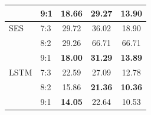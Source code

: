\documentclass[conference]{IEEEtran}
\begin{document}
\begin{table}[ht]
\begin{tabular}{|l|l|c|c|c|}
                               & 9:1                         & 18.66                     & 29.27                          & 13.90                    \\ \hline
        SES                    & 7:3                         & 29.72                     & 36.02                          & 18.90                    \\ \cline{2-5}
                               & 8:2                         & 29.26                     & 66.71                          & 66.71                    \\ \cline{2-5}
                               & 9:1                         & \textbf{18.00}            & \textbf{31.29}                 & \textbf{13.89}           \\ \hline
        LSTM                   & 7:3                         & 22.59                     & 27.09                          & 12.78                    \\ \cline{2-5}
                               & 8:2                         & 15.86                     & \textbf{21.36}                 & \textbf{10.36}           \\ \cline{2-5}
                               & 9:1                         & \textbf{14.05}            & 22.64                          & 10.53                    \\ \hline
    \end{tabular}
\end{table}
\end{document}
